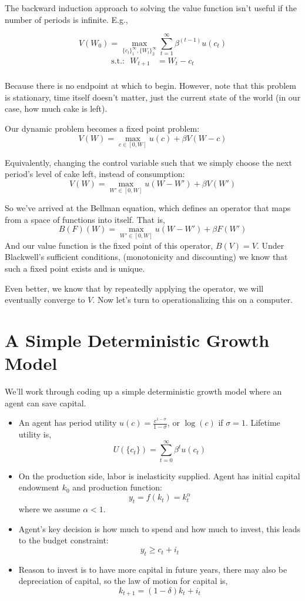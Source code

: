 \documentclass[twoside]{article}
\begin{document}
The backward induction approach to solving the value function isn't useful if the number of periods is infinite. E.g.,

$$V(W_0) = \max_{\{c_t\}_1^\infty, \{W_t\}_2^{\infty}} \sum_{t=1}^\infty \beta^{(t-1)} u(c_t) $$ 
\begin{align*}
\mbox{s.t.:~~} W_{t+1} &= W_t - c_t \\
\end{align*}

Because there is no endpoint at which to begin. However, note that this problem is stationary, time itself doesn't matter, just the current state of the world (in our case, how much cake is left). 

Our dynamic problem becomes a fixed point problem:
$$ V(W) = \max_{c\in [0,W]} u(c) + \beta V(W - c) $$

Equivalently, changing the control variable such that we simply choose the next period's level of cake left, instead of consumption: 
$$ V(W) = \max_{W' \in [0,W]} u(W - W') + \beta V(W') $$

So we've arrived at the Bellman equation, which defines an operator that maps from a space of functions into itself. That is,
$$B(F)(W) = \max_{W' \in [0,W]} u(W - W') + \beta F(W')$$
And our value function is the fixed point of this operator, $B(V) = V$. Under Blackwell's sufficient conditions, (monotonicity and discounting) we know
that such a fixed point exists and is unique. 

Even better, we know that by repeatedly applying the operator, we will eventually converge to $V$. Now let's turn to operationalizing this on 
a computer.

\section{A Simple Deterministic Growth Model}

We'll work through coding up a simple deterministic growth model where an agent can save capital.

\begin{itemize}
\item An agent has period utility $u(c) = \frac{c^{1-\sigma}}{1-\sigma}$, or $\log(c)$ if $\sigma = 1$. Lifetime utility is, 
$$ U(\{c_t\}) = \sum_{t=0}^\infty \beta^t u(c_t)$$
\item On the production side, labor is inelasticity supplied. Agent has initial capital endowment $k_0$ and production function:
$$ y_t = f(k_t) = k_t^\alpha $$
where we assume $\alpha < 1$. 
\item Agent's key decision is how much to spend and how much to invest, this leads to the budget constraint: 
$$ y_t \geq c_t + i_t$$
\item Reason to invest is to have more capital in future years, there may also be depreciation of capital, so the law of motion for capital is, 
$$ k_{t+1} = (1- \delta)k_t + i_t$$
\end{itemize}
\end{document}
